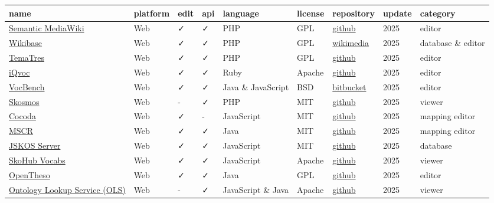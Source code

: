 \documentclass[
  DIV=10]{article}
\begin{document}
\begin{longtable}[]{@{}lllllllll@{}}
\toprule\noalign{}
name & platform & edit & api & language & license & repository & update
& category \\
\midrule\noalign{}
\endhead
\bottomrule\noalign{}
\endlastfoot
\href{https://www.semantic-mediawiki.org/}{Semantic MediaWiki} & Web & ✓
& ✓ & PHP & GPL &
\href{https://github.com/SemanticMediaWiki/SemanticMediaWiki/}{github} &
2025 & editor \\
\href{http://wikiba.se/}{Wikibase} & Web & ✓ & ✓ & PHP & GPL &
\href{https://gerrit.wikimedia.org/g/mediawiki/extensions/Wikibase}{wikimedia}
& 2025 & database \& editor \\
\href{https://vocabularyserver.com/web/}{TemaTres} & Web & ✓ & ✓ & PHP &
GPL &
\href{https://github.com/tematres/TemaTres-Vocabulary-Server}{github} &
2025 & editor \\
\href{https://iqvoc.net/}{iQvoc} & Web & ✓ & ✓ & Ruby & Apache &
\href{https://github.com/innoq/iqvoc}{github} & 2025 & editor \\
\href{https://vocbench.uniroma2.it/}{VocBench} & Web & ✓ & ✓ & Java \&
JavaScript & BSD &
\href{https://bitbucket.org/art-uniroma2/vocbench3/src/master/}{bitbucket}
& 2025 & editor \\
\href{https://skosmos.org/}{Skosmos} & Web & - & ✓ & PHP & MIT &
\href{https://github.com/NatLibFi/Skosmos}{github} & 2025 & viewer \\
\href{https://coli-conc.gbv.de/cocoda/}{Cocoda} & Web & ✓ & - &
JavaScript & MIT & \href{https://github.com/gbv/cocoda}{github} & 2025 &
mapping editor \\
\href{https://cscfi.github.io/mscr-docs/}{MSCR} & Web & ✓ & ✓ & Java &
MIT & \href{https://github.com/CSCfi/mscr-compose}{github} & 2025 &
mapping editor \\
\href{https://github.com/gbv/jskos-server}{JSKOS Server} & Web & ✓ & ✓ &
JavaScript & MIT & \href{https://github.com/gbv/jskos-server}{github} &
2025 & database \\
\href{https://github.com/skohub-io/skohub-vocabs}{SkoHub Vocabs} & Web &
✓ & ✓ & JavaScript & Apache &
\href{https://github.com/skohub-io/skohub-vocabs}{github} & 2025 &
viewer \\
\href{https://opentheso.hypotheses.org/}{OpenTheso} & Web & ✓ & ✓ & Java
& GPL & \href{https://github.com/miledrousset/Opentheso}{github} & 2025
& editor \\
\href{https://github.com/EBISPOT/ols4}{Ontology Lookup Service (OLS)} &
Web & - & ✓ & JavaScript \& Java & Apache &
\href{https://github.com/EBISPOT/OLS}{github} & 2025 & viewer \\

\end{longtable}
\end{document}
